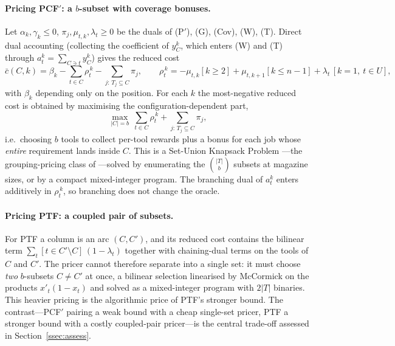 \documentclass[11pt,a4paper]{article}
\theoremstyle{plain}
\theoremstyle{definition}
\theoremstyle{remark}
\newcommand{\U}{U}
\begin{document}
\paragraph{Pricing PCF$'$: a $b$-subset with coverage bonuses.}
Let $\alpha_k,\gamma_k\le0$, $\pi_j,\mu_{t,k},\lambda_t\ge0$ be the duals of (P$'$),
(G), (Cov), (W), (T). Direct dual accounting (collecting the coefficient of $y_C^{k}$,
which enters (W) and (T) through $a_t^{k}=\sum_{C\ni t}y_C^{k}$) gives the reduced cost
\[
  \bar c(C,k)=\beta_k-\sum_{t\in C}\rho_t^{\,k}-\!\!\sum_{j:\,T_j\subseteq C}\!\!\pi_j,
  \qquad
  \rho_t^{\,k}=-\mu_{t,k}[k\ge2]+\mu_{t,k+1}[k\le n-1]+\lambda_t\,[k=1,\ t\in\U],
\]
with $\beta_k$ depending only on the position. For each $k$ the most-negative reduced
cost is obtained by maximising the configuration-dependent part,
\[
  \max_{\lvert C\rvert=b}\ \sum_{t\in C}\rho_t^{\,k}+\!\!\sum_{j:\,T_j\subseteq C}\!\!\pi_j ,
\]
i.e.\ choosing $b$ tools to collect per-tool rewards plus a bonus for each job whose
\emph{entire} requirement lands inside $C$. This is a Set-Union Knapsack Problem
\citep{Goldschmidt1994}---the grouping-pricing class of \citet{Crama1994Column}%
---solved by enumerating the $\binom{\lvert T\rvert}{b}$ subsets at magazine sizes, or
by a compact mixed-integer program. The branching dual of $a_t^{k}$ enters additively
in $\rho_t^{\,k}$, so branching does not change the oracle.

\paragraph{Pricing PTF: a coupled pair of subsets.}
For PTF a column is an arc $(C,C')$, and its reduced cost contains the bilinear term
$\sum_t[t\in C'\setminus C]\,(1-\lambda_t)$ together with chaining-dual terms on the
tools of $C$ and $C'$. The pricer cannot therefore separate into a single set: it must
choose \emph{two} $b$-subsets $C\ne C'$ at once, a bilinear selection linearised by
McCormick on the products $x'_t(1-x_t)$ and solved as a mixed-integer program with
$2\lvert T\rvert$ binaries. This heavier pricing is the algorithmic price of PTF's
stronger bound. The contrast---PCF$'$ pairing a weak bound with a cheap single-set pricer, PTF a
stronger bound with a costly coupled-pair pricer---is the central trade-off assessed
in Section~\ref{ssec:assess}.

\end{document}
